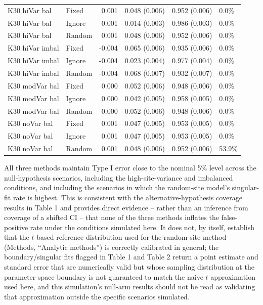 \documentclass[
  11pt,
]{article}
\newcounter{none} %
\begin{document}
\begin{table}[!h]
{\begin{tabular}[t]{llrlll}
K30 hiVar bal & Fixed & 0.001 & 0.048 (0.006) & 0.952 (0.006) & 0.0\%\\
K30 hiVar bal & Ignore & 0.001 & 0.014 (0.003) & 0.986 (0.003) & 0.0\%\\
K30 hiVar bal & Random & 0.001 & 0.048 (0.006) & 0.952 (0.006) & 0.0\%\\
K30 hiVar imbal & Fixed & -0.004 & 0.065 (0.006) & 0.935 (0.006) & 0.0\%\\
K30 hiVar imbal & Ignore & -0.004 & 0.023 (0.004) & 0.977 (0.004) & 0.0\%\\
K30 hiVar imbal & Random & -0.004 & 0.068 (0.007) & 0.932 (0.007) & 0.0\%\\
K30 modVar bal & Fixed & 0.000 & 0.052 (0.006) & 0.948 (0.006) & 0.0\%\\
K30 modVar bal & Ignore & 0.000 & 0.042 (0.005) & 0.958 (0.005) & 0.0\%\\
K30 modVar bal & Random & 0.000 & 0.052 (0.006) & 0.948 (0.006) & 0.0\%\\
K30 noVar bal & Fixed & 0.001 & 0.047 (0.005) & 0.953 (0.005) & 0.0\%\\
K30 noVar bal & Ignore & 0.001 & 0.047 (0.005) & 0.953 (0.005) & 0.0\%\\
K30 noVar bal & Random & 0.001 & 0.048 (0.006) & 0.952 (0.006) & 53.9\%\\
\bottomrule
\end{tabular}}
\end{table}

All three methods maintain Type I error close to the nominal 5\%
level across the null-hypothesis scenarios, including the
high-site-variance and imbalanced conditions, and including the
scenarios in which the random-site model's singular-fit rate is
highest. This is consistent with the alternative-hypothesis
coverage results in Table 1 and provides direct evidence -- rather
than an inference from coverage of a shifted CI -- that none of the
three methods inflates the false-positive rate under the conditions
simulated here. It does not, by itself, establish that the
\(t\)-based reference distribution used for the random-site method
(Methods, ``Analytic methods'') is correctly calibrated in general;
the boundary/singular fits flagged in Table 1 and Table 2 return a
point estimate and standard error that are numerically valid but
whose sampling distribution at the parameter-space boundary is not
guaranteed to match the naive \(t\) approximation used here, and this
simulation's null-arm results should not be read as validating that
approximation outside the specific scenarios simulated.
\end{document}
